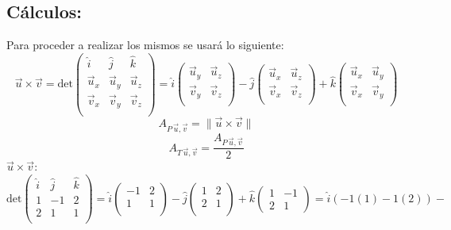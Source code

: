 \documentclass[letterpaper, 12pt]{article}
\begin{document}
\subsection*{Cálculos:}
Para proceder a realizar los mismos se usará lo siguiente:\\
\[\vec{u}\times \vec{v}=\text{det}\begin{pmatrix} %
    \hat{i} &\hat{j}& \hat{k}\\
    \vec{u}_x &\vec{u}_y&\vec{u}_z\\
    \vec{v}_x&\vec{v}_y&\vec{v}_z\\
\end{pmatrix}=\hat{i}\begin{pmatrix}
    \vec{u}_y&\vec{u}_z\\
    \vec{v}_y&\vec{v}_z\\
\end{pmatrix}-\hat{j}\begin{pmatrix}
    \vec{u}_x&\vec{u}_z\\
    \vec{v}_x&\vec{v}_z\\
\end{pmatrix}+\hat{k}\begin{pmatrix}
    \vec{u}_x&\vec{u}_y\\
    \vec{v}_x&\vec{v}_y\\
\end{pmatrix}\]
\[A_{P\,\vec{u},\vec{v}}=\lVert\vec{u}\times \vec{v}\rVert\]
\[A_{T\,\vec{u},\vec{v}}=\frac{A_{P\,\vec{u},\vec{v}}}{2}\]
\(\vec{u}\times \vec{v}\):\\ \newline
\(\text{det}\begin{pmatrix}
    \hat{i} &\hat{j}& \hat{k}\\
            1&-1&2\\
            2&1&1\\
\end{pmatrix}=\hat{i}\begin{pmatrix}
    -1&2\\
    1&1\\
\end{pmatrix}-\hat{j}\begin{pmatrix}
    1&2\\
    2&1\\
\end{pmatrix}+\hat{k}\begin{pmatrix}
    1&-1\\
    2&1
\end{pmatrix}=\hat{i}(-1(1)-1(2))-\)\\ \newline
\end{document}
